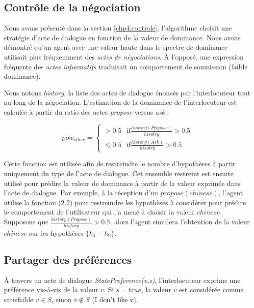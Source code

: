 \subsection{Contrôle de la négociation}

Nous avons présenté dans la section \ref{chp4:controle}, l'algorithme  choisit une stratégie d'acte de dialogue en fonction de la valeur de dominance. Nous avons démontré qu'un agent avec une valeur haute dans le spectre de dominance utilisait plus fréquemment des \emph{actes de négociations}. À l'opposé, une expression fréquente des \emph{actes informatifs} traduisait un comportement de soumission (faible dominance). 

Nous notons \textit{history}, la liste des actes de dialogue énoncés par l'interlocuteur tout au long de la négociation. L'estimation de la dominance de l'interlocuteur est calculée à partir du ratio des actes \emph{propose} versus \emph{ask} :

	
	\begin{equation}
	pow_{other} = \left\{\begin{array}{ll}
	> 0.5 & \mathrm{if } \frac{history(Propose)}{hisotry} > 0.5\\
	\leq 0.5 & \mathrm{if  } \frac{history(Ask)}{hisotry} > 0.5
	\end{array}\right.
	\end{equation}
	
	Cette fonction est utilisée afin de restreindre le nombre d'hypothèses à partir uniquement du type de l'acte de dialogue. Cet ensemble restreint est ensuite utilisé pour prédire la valeur de dominance à partir de la valeur exprimée dans l'acte de dialogue. Par exemple, à la réception d'un $propose(chinese)$, l'agent utilise la fonction (2.2) pour restreindre les hypothèses à considérer pour prédire le comportement de l'utilisateur qui l'a mené à choisir la valeur $chinese$. Supposons que $\frac{history(Propose)}{history} > 0.5$, alors l'agent simulera l'obtention de la valeur $chinese$ sur les hypothèses $\{h_4 - h_9\}$.
	

\subsection{Partager des préférences}
À travers un acte de dialogue \emph{StatePreference(v,s)}, l'interlocuteur exprime une préférence vis-à-vis de la valeur $v$. Si $s =true$, la valeur $v$ est considérée comme satisfiable $v \in S$, sinon $v \not \in S$ (I don't like v). 

